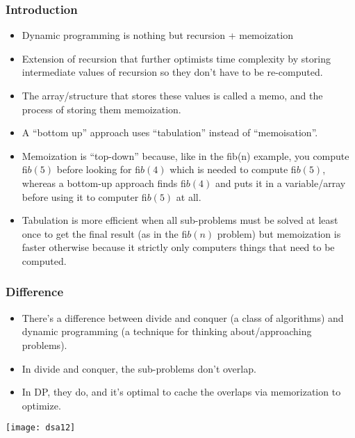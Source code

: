 \begin{frame}[fragile]
	\frametitle{Introduction}
		
			\begin{itemize}
			\item Dynamic programming is nothing but recursion + memoization
				\item Extension of recursion that further optimists time complexity by storing intermediate values of 
recursion so they don’t have to be re-computed. 
				\item The array/structure that stores these values is 
called a memo, and the process of storing them memoization. 
				\item A ``bottom up” approach uses 
``tabulation” instead of ``memoisation''. 
				\item Memoization is ``top-down'' because, like in the ﬁb(n) 
example, you compute $ﬁb(5)$ before looking for $ﬁb(4)$ which is needed to compute $ﬁb(5)$, whereas a 
bottom-up approach finds $ﬁb(4)$ and puts it in a variable/array before using it to computer $ﬁb(5)$ at 
all. 
				\item Tabulation is more efficient when all sub-problems must be solved at least once to get the final 
result (as in the $ﬁb(n)$ problem) but memoization is faster otherwise because it strictly only 
computers things that need to be computed. 
			\end{itemize}
\end{frame}

\begin{frame}[fragile]
	\frametitle{Difference}
		
			\begin{itemize}
				\item There’s a difference between divide and conquer (a class of algorithms) and dynamic programming 
(a technique for thinking about/approaching problems). 
\item In divide and conquer, the sub-problems 
don’t overlap. 
\item In DP, they do, and it’s optimal to cache the overlaps via memorization to optimize. 
			\end{itemize}
			
\begin{center}
\texttt{[image: dsa12]}
\end{center}				
\end{frame}

